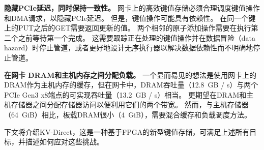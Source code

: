 \textbf {隐藏PCIe延迟，同时保持一致性。}
网卡上的高效键值存储必须合理调度键值操作和DMA请求，以隐藏PCIe延迟。
但是，键值操作可能具有依赖性。
在同一个键上的PUT之后的GET需要返回更新的值。
两个相邻的原子添加操作需要在执行第二个之前等待第一个完成。
这需要跟踪正在处理的键值操作并在数据冒险（data hazard）时停止管道，或者更好地设计无序执行器以解决数据依赖性而不明确地停止管道。


\textbf {在网卡 DRAM和主机内存之间分配负载。}
一个显而易见的想法是使用网卡上的DRAM作为主机内存的缓存，但在网卡中，DRAM吞吐量（12.8~GB / s）与两个PCIe Gen3 x8端点的可实现吞吐量（13.2~GB / s）相当。 
更期望在DRAM和主机存储器之间分配存储器访问以便利用它们的两个带宽。
然而，与主机存储器（64~GiB）相比，板载DRAM很小（4~GiB），需要混合缓存和负载调度方法。

下文将介绍KV-Direct，这是一种基于FPGA的新型键值存储，可满足上述所有目标，并描述如何应对这些挑战。
